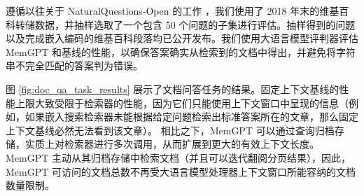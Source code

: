 \documentclass[UTF8,fontset=fandol,a4paper,11pt]{ctexart}
\newcommand{\ours}{MemGPT\xspace}
\begin{document}
遵循以往关于 NaturalQuestions-Open 的工作 \citep{izacard2020leveraging, izacard2021unsupervised}，我们使用了 2018 年末的维基百科转储数据，并抽样选取了一个包含 50 个问题的子集进行评估。抽样得到的问题以及完成嵌入编码的维基百科段落均已公开发布。我们使用大语言模型评判器评估 \ours 和基线的性能，以确保答案确实从检索到的文档中得出，并避免将字符串不完全匹配的答案判为错误。


图 \ref{fig:doc_qa_task_results} 展示了文档问答任务的结果。固定上下文基线的性能上限大致受限于检索器的性能，因为它们只能使用上下文窗口中呈现的信息（例如，如果嵌入搜索检索器未能根据给定问题检索出标准答案所在的文章，那么固定上下文基线必然无法看到该文章）。
相比之下，\ours 可以通过查询归档存储，实质上对检索器进行多次调用，从而扩展到更大的有效上下文长度。
\ours 主动从其归档存储中检索文档（并且可以迭代翻阅分页结果），因此，\ours 可访问的文档总数不再受大语言模型处理器上下文窗口所能容纳的文档数量限制。
\end{document}
